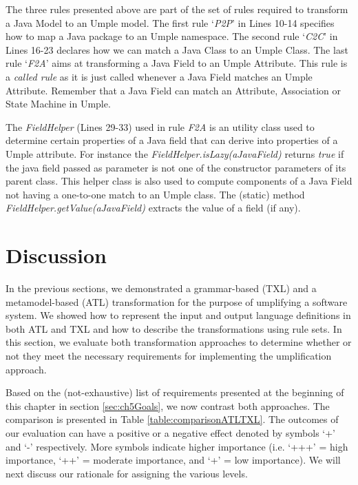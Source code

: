 The three rules presented above are part of the set of rules required to transform a Java Model to an Umple model.  The first rule `\textit{P2P}' in Lines 10-14  specifies how to map a Java package to an Umple namespace. The second rule `\textit{C2C}' in Lines 16-23 declares how we can match a Java Class to an Umple Class. The last rule `\textit{F2A}' aims at transforming a Java Field to an Umple Attribute. This rule is a \textit{called rule} as it is just called whenever a Java Field matches an Umple Attribute. Remember that a Java Field can match an Attribute, Association or State Machine in Umple.

The \textit{FieldHelper} (Lines 29-33) used in rule \textit{F2A} is an utility class used to determine certain properties of a Java field that can derive into properties of a Umple attribute. For instance the \textit{FieldHelper.isLazy(aJavaField)} returns \textit{true} if the java field passed as parameter is not one of the constructor parameters of its parent class. This helper class is also used to compute components of a Java Field not having a one-to-one match to an Umple class. The (static) method \textit{FieldHelper.getValue(aJavaField)} extracts the value of a field (if any). 

\section{Discussion}

In the previous sections, we demonstrated a grammar-based (TXL) and a metamodel-based (ATL) transformation for the purpose of umplifying a software system. We showed how to represent the input and output language definitions in both ATL and TXL and how to describe the transformations using rule sets. In this section, we evaluate both transformation approaches to determine whether or not they meet the necessary requirements for implementing the umplification approach. 

Based on the (not-exhaustive) list of requirements presented at the beginning of this chapter in section \ref{sec:ch5Goals}, we now contrast both approaches. The comparison is presented in Table \ref{table:comparisonATLTXL}. The outcomes of our evaluation can have a positive or a negative effect denoted by symbols `+' and `-' respectively. More symbols indicate higher importance  (i.e.  `+++' = high importance, `++' = moderate importance, and `+' = low importance). We will next discuss our rationale for assigning the various levels.

